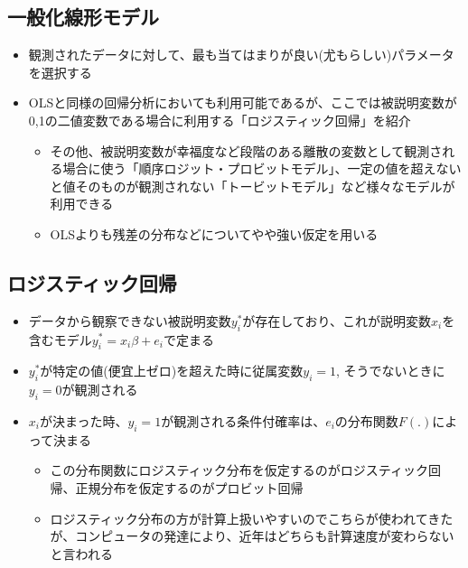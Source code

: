 \documentclass[
]{ltjsarticle}
\providecommand{\tightlist}{%
  \setlength{\itemsep}{0pt}\setlength{\parskip}{0pt}}
\begin{document}
\hypertarget{ux4e00ux822cux5316ux7ddaux5f62ux30e2ux30c7ux30eb}{%
\subsection{一般化線形モデル}\label{ux4e00ux822cux5316ux7ddaux5f62ux30e2ux30c7ux30eb}}

\begin{itemize}
\tightlist
\item
  観測されたデータに対して、最も当てはまりが良い(尤もらしい)パラメータを選択する
\item
  OLSと同様の回帰分析においても利用可能であるが、ここでは被説明変数が0,1の二値変数である場合に利用する「ロジスティック回帰」を紹介

  \begin{itemize}
  \tightlist
  \item
    その他、被説明変数が幸福度など段階のある離散の変数として観測される場合に使う「順序ロジット・プロビットモデル」、一定の値を超えないと値そのものが観測されない「トービットモデル」など様々なモデルが利用できる
  \item
    OLSよりも残差の分布などについてやや強い仮定を用いる
  \end{itemize}
\end{itemize}

\hypertarget{ux30edux30b8ux30b9ux30c6ux30a3ux30c3ux30afux56deux5e30}{%
\subsection{ロジスティック回帰}\label{ux30edux30b8ux30b9ux30c6ux30a3ux30c3ux30afux56deux5e30}}

\begin{itemize}
\tightlist
\item
  データから観察できない被説明変数\(y^*_i\)が存在しており、これが説明変数\(x_i\)を含むモデル\(y^*_i = x_i \beta + e_i\)で定まる
\item
  \(y^*_i\)が特定の値(便宜上ゼロ)を超えた時に従属変数\(y_i = 1\),
  そうでないときに\(y_i = 0\)が観測される
\item
  \(x_i\)が決まった時、\(y_i = 1\)が観測される条件付確率は、\(e_i\)の分布関数\(F(.)\)によって決まる

  \begin{itemize}
  \tightlist
  \item
    この分布関数にロジスティック分布を仮定するのがロジスティック回帰、正規分布を仮定するのがプロビット回帰
  \item
    ロジスティック分布の方が計算上扱いやすいのでこちらが使われてきたが、コンピュータの発達により、近年はどちらも計算速度が変わらないと言われる
  \end{itemize}
\end{itemize}
\end{document}
